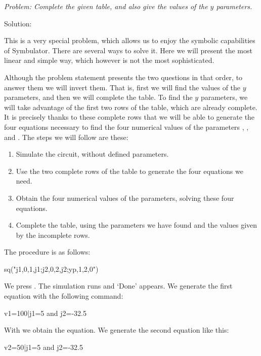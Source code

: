 
\emph{Problem: Complete the given table, and also give the values of
the $y$ parameters.}

Solution:

This is a very special problem, which allows us to enjoy the
symbolic capabilities of Symbulator. There are several ways to solve
it. Here we will present the most linear and simple way, which
however is not the most sophisticated.

Although the problem statement presents the two questions in that
order, to answer them we will invert them. That is, first we will
find the values of the $y$ parameters, and then we will complete the
table. To find the $y$ parameters, we will take advantage of the
first two rows of the table, which are already complete. It is
precisely thanks to these complete rows that we will be able to
generate the four equations necessary to find the four numerical
values of the parameters , ,  and
. The steps we will follow are these:

\begin{enumerate}
\item Simulate the circuit, without defined parameters.
\item Use the two complete rows of the table to generate the four
  equations we need.
\item Obtain the four numerical values of the parameters, solving
  these four equations.
\item Complete the table, using the parameters we have found and the
  values given by the incomplete rows.
\end{enumerate}

The procedure is as follows:

\begin{entry}
sq\dc("j1,0,1,j1;j2,0,2,j2;yp,1,2,0")
\end{entry}

We press . The simulation runs and `Done' appears. We
generate the first equation with the following command:

\begin{entry}
v1=100|j1=5 and j2=-32.5
\end{entry}

With  we obtain the equation. We generate the second
equation like this:

\begin{entry}
v2=50|j1=5 and j2=-32.5
\end{entry}

